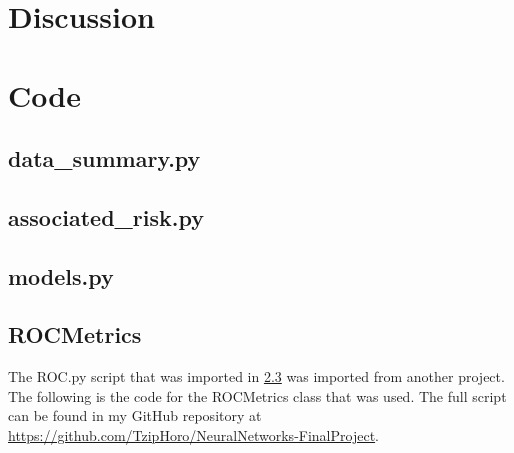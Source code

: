 \documentclass[journal,12pt,onecolumn]{article}
\begin{document}
\section{Discussion}




\clearpage

\singlespacing



\clearpage
\onecolumn

\appendix
\renewcommand{\thesection}{\Alph{section}}

\section{Code}\label{sec:code}

\subsection{data\_summary.py}\label{subsec:data_summary.py}


\clearpage

\subsection{associated\_risk.py}\label{subsec:associated_risk.py}


\clearpage

\subsection{models.py}\label{subsec:models.py}


\clearpage

\subsection{ROCMetrics}\label{subsec:ROC.py}
The ROC.py script that was imported in \ref{subsec:models.py} was imported from another project. The following is the code for the ROCMetrics class that was used. The full script can be found in my GitHub repository at \href{https://github.com/TzipHoro/NeuralNetworks-FinalProject/blob/master/ROC.py}{https://github.com/TzipHoro/NeuralNetworks-FinalProject}. 


\end{document}
